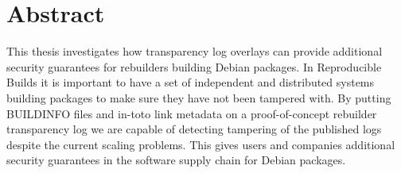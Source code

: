 \documentclass[../Main/thesis.tex]{subfiles}
\begin{document}
\chapter*{Abstract}
This thesis investigates how transparency log overlays can provide additional
security guarantees for rebuilders building Debian packages. In Reproducible
Builds it is important to have a set of independent and distributed systems
building packages to make sure they have not been tampered with. By putting
BUILDINFO files and in-toto link metadata on a proof-of-concept rebuilder
transparency log we are capable of detecting tampering of the published logs
despite the current scaling problems. This gives users and companies additional
security guarantees in the software supply chain for Debian packages.
\vfill\vfill
\blankpage
\end{document}
